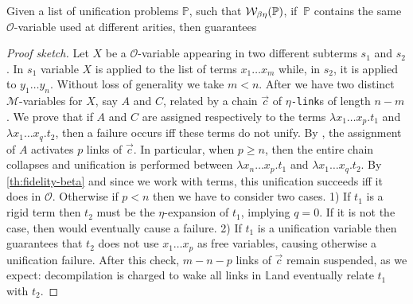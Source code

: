 \documentclass[sigconf,natbib=false,review]{acmart}
\newcommand{\linkMacro}[1]{\ensuremath{#1}\texttt{-link}\xspace}
\newcommand{\linketa} {\linkMacro{\eta}}
\newcommand{\Fo}{\texorpdfstring{\ensuremath{\mathcal{O}}\xspace}{O}}
\newcommand{\Ho}{\texorpdfstring{\ensuremath{\mathcal{M}}\xspace}{M}}
\newcommand{\linkStore}{\texorpdfstring{\ensuremath{\mathbb{L}}\xspace}{L}}
\newcommand{\foUnifPb}{\ensuremath{\mathbb{P}}\xspace}
\begin{document}
\begin{theorem}
  Given a list of unification problems \foUnifPb, such that 
  $\wellb_{\beta \eta}(\foUnifPb)$,
  if $\ \foUnifPb$ contains the same \Fo{}-variable used at different arities,
  then \mapdeduplication guarantees 
\end{theorem}

\def\chain{\ensuremath{\vec{c}}\xspace}

\begin{proof}[Proof sketch]
  Let $X$ be a \Fo{}-variable appearing in two different subterms $s_1$ and $s_2$.
  In $s_1$ variable $X$ is applied to the list of terms $x_1\dots x_m$ while, in $s_2$,
  it is applied to $y_1\dots y_n$. Without loss of generality we take $m < n$.
  After \mapdeduplication we have two distinct \Ho{}-variables for $X$, say $A$ and $C$,
  related by a chain \chain of \linketa{}s of length $n - m$. We prove that
  if $A$ and $C$ are assigned respectively to the \wellb terms $\lambda x_1\dots
  x_p.t_1$ and $\lambda x_1\dots x_q.t_2$, then a failure occurs iff
  these terms do not unify. By \progressetaleft, the assignment of $A$
  activates $p$ links of \chain. In particular, when $p \geq n$, then the entire
  chain collapses and unification is performed between $\lambda x_n\dots
  x_p.t_1$ and $\lambda x_1\dots x_q.t_2$. By \cref{th:fidelity-beta} and since
  we work with \wellb terms, this unification succeeds iff it does in \Fo.
  Otherwise if $p < n$ then we have to consider two cases. 1) If $t_1$ is a rigid
  term then $t_2$ must be the $\eta$-expansion of $t_1$, implying $q = 0$. If it
  is not the case, then \progressetaleft
  would eventually cause a failure. 2) If $t_1$ is a
  unification variable then  guarantees that $t_2$ does not use
  $x_1\dots x_p$ as free variables, causing otherwise a unification failure.
  After this check, $m - n - p$ links of \chain remain suspended, as we expect:
  decompilation is charged to wake all links in \linkStore and eventually relate
  $t_1$ with $t_2$.

\end{proof}
\end{document}

